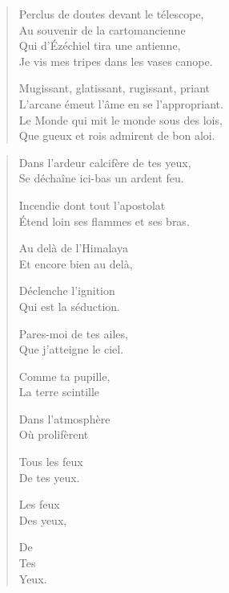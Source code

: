 \begin{verse}
  Perclus de doutes devant le télescope,\\  %
  Au souvenir de la cartomancienne\\  %
  Qui d’Ézéchiel tira une antienne,\\  %
  Je vis mes tripes dans les vases canope.

  Mugissant, glatissant, rugissant, priant\\  %
  L’arcane émeut l’âme en se l’appropriant.\\  %
  Le Monde qui mit le monde sous des lois,\\  %
  Que gueux et rois admirent de bon aloi.
\end{verse}

\begin{verse}%
  \distique%
  Dans l’ardeur calcifère de tes yeux,\\  %
  Se déchaîne ici-bas un ardent feu.

  Incendie dont tout l’apostolat\\  %
  Étend loin ses flammes et ses bras.

  Au delà de l’Himalaya\\  %
  Et encore bien au delà,

  Déclenche l’ignition\\  %
  Qui est la séduction.

  Pares-moi de tes ailes,\\  %
  Que j’atteigne le ciel.

  Comme ta pupille,\\  %
  La terre scintille

  Dans l’atmosphère\\  %
  Où  prolifèrent

  Tous les feux\\  %
  De tes yeux.

  Les feux\\  %
  Des yeux,

  De\\  %
  Tes\\  %
  Yeux.
\end{verse}





